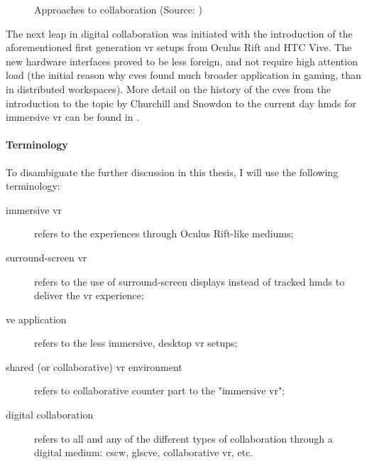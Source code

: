 \begin{figure}
	\centering
	\hfill
	\hfill
	\hfill
	\caption{Approaches to collaboration (Source: \cite{churchill_collaborative_1998})}
	\label{fig:approaches_to_collaboration}
\end{figure}

The next leap in digital collaboration was initiated with the introduction of the aforementioned first generation \gls{vr} setups from Oculus Rift and HTC Vive. The new hardware interfaces proved to be less foreign, and not require high attention load (the initial reason why \gls{cve}s found much broader application in gaming, than in distributed workspaces). More detail on the history of the \gls{cve}s from the introduction to the topic by Churchill and Snowdon to the current day \gls{hmd}s for immersive \gls{vr} can be found in \cite{greenwald_technology_2017}.

\paragraph{Terminology}
To disambiguate the further discussion in this thesis, I will use the following terminology:  
\begin{description}
	\item[immersive \gls{vr}] refers to the experiences through Oculus Rift-like mediums;
	\item[surround-screen \gls{vr}] refers to the use of surround-screen displays instead of tracked \gls{hmd}s to deliver the \gls{vr} experience;
	\item[\gls{ve} application] refers to the less immersive, desktop \gls{vr} setups;
	\item[shared (or collaborative) \gls{vr} environment] refers to collaborative counter part to the "immersive \gls{vr}";
	\item[digital collaboration] refers to all and any of the different types of collaboration through a digital medium: \gls{cscw}, gls{cve}, collaborative \gls{vr}, etc.
\end{description}


